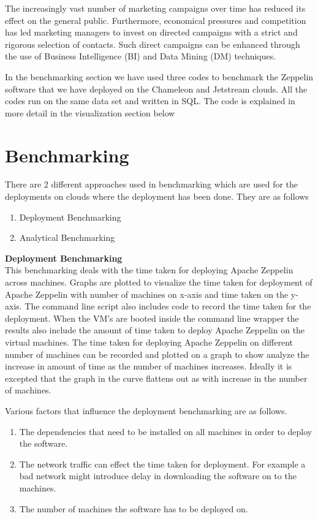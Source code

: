 \documentclass[9pt,twocolumn,twoside]{../../styles/osajnl}
\begin{document}
	The increasingly vast number of marketing campaigns over time has 
	reduced its effect on the general public. Furthermore, economical 
	pressures and competition has led marketing managers to invest on 
	directed campaigns with a strict and rigorous selection of 
	contacts. 
	Such direct campaigns can be enhanced through the use of Business 
	Intelligence (BI) and Data Mining (DM) techniques.
	
	In the benchmarking section we have used three codes to benchmark 
	the Zeppelin software that we have deployed on the Chameleon and 
	Jetstream clouds. All the codes run on the same data set and 
	written in SQL. The code is explained in more detail in the 
	visualization section below
	
	\section{Benchmarking}
	
	There are 2 different approaches used in benchmarking which are 
	used 
	for the deployments on clouds where the deployment has been done. 
	They are as follows
	
	\begin{enumerate}
		\item Deployment Benchmarking
		\item Analytical Benchmarking
	\end{enumerate}
	
	{\bf \hspace{-3ex}Deployment Benchmarking}
	\\
	This benchmarking deals with the time taken for deploying Apache 
	Zeppelin across machines. Graphs are plotted to visualize the 
	time 
	taken for deployment of Apache Zeppelin with number of machines 
	on 
	x-axis and time taken on the y-axis. The command line script also 
	includes code to record the time taken for the deployment. When 
	the 
	VM's are booted inside the command line wrapper the 
	results 
	also include the amount of time taken to deploy Apache Zeppelin 
	on 
	the virtual machines. The time taken for deploying Apache 
	Zeppelin on 
	different number of machines can be recorded and plotted on a 
	graph 
	to show analyze the increase in amount of time as the number of 
	machines increases. Ideally it is excepted that the graph in the 
	curve flattens out as with increase in the number of machines.
	
	Various factors that influence the deployment benchmarking are as 
	follows.
	\begin{enumerate}
		\item The dependencies that need to be installed on all 
		machines 
		in order to deploy the software.
		\item The network traffic can effect the time taken for 
		deployment. For example a bad network might introduce delay 
		in 
		downloading the software on to the machines.
		\item The number of machines the software has to be deployed 
		on. 
	\end{enumerate}
	
\end{document}
